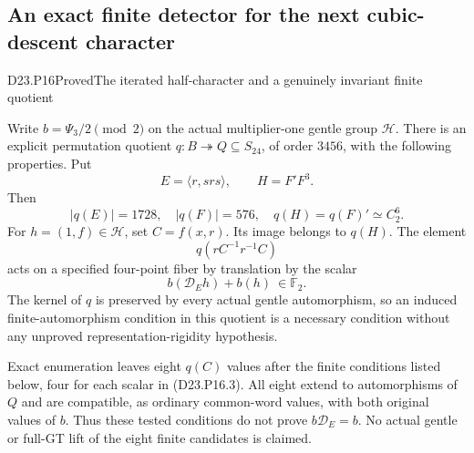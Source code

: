 \subsection{An exact finite detector for the next cubic-descent character}

\begin{statement}{D23.P16}{Proved}{The iterated half-character and a genuinely invariant finite quotient}
\end{statement}
Write $b=\Psi_3/2\pmod2$ on the actual multiplier-one gentle
group $\mathcal H$. There is an explicit permutation quotient
$q:B\twoheadrightarrow Q\subseteq S_{24}$, of order $3456$,
with the following properties. Put
\[
 E=\langle r,srs\rangle,\qquad H=F'F^3.
\]
Then
\[
 |q(E)|=1728,\quad |q(F)|=576,\quad
 q(H)=q(F)'\simeq C_2^6.
 \tag{D23.P16.1}
\]
For $h=(1,f)\in\mathcal H$, set $C=f(x,r)$. Its image belongs
to $q(H)$. The element
\[
 q(rC^{-1}r^{-1}C)
 \tag{D23.P16.2}
\]
acts on a specified four-point fiber by translation by the scalar
\[
 \boxed{\ b(\mathcal D_E h)+b(h)\ \in\mathbb F_2.\ }
 \tag{D23.P16.3}
\]
The kernel of $q$ is preserved by every actual gentle
automorphism, so an induced finite-automorphism condition in this
quotient is a necessary condition without any unproved
representation-rigidity hypothesis.

Exact enumeration leaves eight $q(C)$ values after the finite
conditions listed below, four for each scalar in (D23.P16.3).
All eight extend to automorphisms of $Q$ and are compatible,
as ordinary common-word values, with both original values of
$b$. Thus these tested conditions do not prove $b\mathcal D_E=b$.
No actual gentle or full-GT lift of the eight finite candidates
is claimed.

